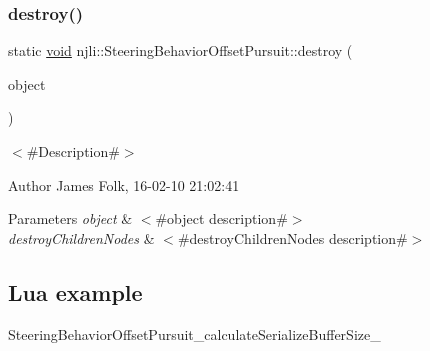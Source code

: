 \subsubsection{\texorpdfstring{destroy()}{destroy()}}
{\footnotesize\ttfamily static \mbox{\hyperlink{_thread_8h_af1e856da2e658414cb2456cb6f7ebc66}{void}} njli\+::\+Steering\+Behavior\+Offset\+Pursuit\+::destroy (\begin{DoxyParamCaption}\item[{\mbox{\hyperlink{classnjli_1_1_steering_behavior_offset_pursuit}{Steering\+Behavior\+Offset\+Pursuit}} $\ast$}]{object }\end{DoxyParamCaption})\hspace{0.3cm}{\ttfamily [static]}}



$<$\#\+Description\#$>$ 

\begin{DoxyAuthor}{Author}
James Folk, 16-\/02-\/10 21\+:02\+:41
\end{DoxyAuthor}

\begin{DoxyParams}{Parameters}
{\em object} & $<$\#object description\#$>$ \\
\hline
{\em destroy\+Children\+Nodes} & $<$\#destroy\+Children\+Nodes description\#$>$\\
\hline
\end{DoxyParams}
\hypertarget{classnjli_1_1_steering_behavior_wander_ex1}{}\subsection{Lua example}\label{classnjli_1_1_steering_behavior_wander_ex1}

\begin{DoxyCodeInclude}
\end{DoxyCodeInclude}
Steering\+Behavior\+Offset\+Pursuit\+\_\+calculate\+Serialize\+Buffer\+Size\+\_\+ \mbox{\label{classnjli_1_1_steering_behavior_offset_pursuit_a3947ab185513f8d580139a61d53f1a05}} 
